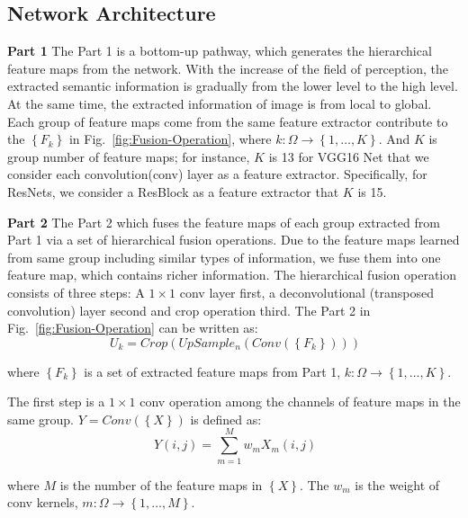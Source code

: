\subsection{Network Architecture}

\textbf{Part 1} The Part 1 is a bottom-up pathway, which generates the hierarchical feature maps from the network. With the increase of the field of perception, the extracted semantic information is gradually from the lower level to the high level. At the same time, the extracted information of image is from local to global. Each group of feature maps come from the same feature extractor contribute to the ${\left\{F_{k}\right\}}$ in Fig.~\ref{fig:Fusion-Operation}, where ${k:\Omega \to\left\{1,\ldots,K\right\}}$. And ${K}$ is group number of feature maps; for instance, ${K}$ is 13 for VGG16 Net that we consider each
convolution(conv) layer as a feature extractor. Specifically, for ResNets, we consider a ResBlock as a feature extractor that ${K}$ is 15.

\textbf{Part 2} The Part 2 which fuses the feature maps of each group extracted from Part 1 via a set of hierarchical fusion operations. Due to the feature maps learned from same group including similar types of information, we fuse them into one feature map, which contains richer information. The hierarchical fusion operation consists of three steps:
A ${1\times1}$ conv layer first, a deconvolutional (transposed convolution) layer second and crop operation third.
The Part 2 in Fig.~\ref{fig:Fusion-Operation} can be written as:
\begin{equation}
    \label{fusion_1}
    \ U_{k}=Crop(UpSample_n(Conv(\left\{F_{k}\right\})))
\end{equation}

where ${\left\{F_{k}\right\}}$ is a set of extracted feature maps from Part 1, ${k:\Omega \to\left\{1,\ldots,K\right\}}$.

The first step is a ${1\times1}$ conv operation among the channels of feature maps in the same group.
${Y = Conv(\left\{X\right\})}$ is defined as:
\begin{equation}
    \label{Conv}
    \ Y(i,j)=\sum_{m=1}^{M}w_{m}X_{m}(i,j)
\end{equation}

 where ${M}$ is the number of the feature maps in ${\left\{X\right\}}$. The ${w_{m}}$ is the weight of conv kernels, ${m:\Omega \to\left\{1,\ldots,M\right\}}$.

